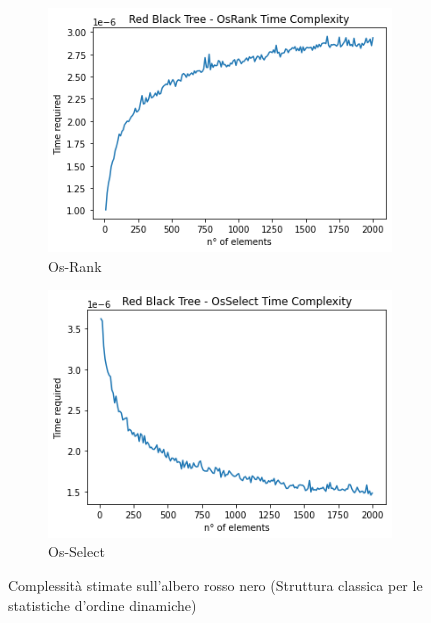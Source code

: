     \begin{figure}[H]
        \centering
        \begin{subfigure}[H]{0.4\textwidth}
            \centering
            \includegraphics[width=1\textwidth]{Images/RB-RANK.png}
            \caption{Os-Rank}
        \end{subfigure}
        \begin{subfigure}[H]{0.4\textwidth}
            \centering
            \includegraphics[width=1\textwidth]{Images/RB-SELECT.png}
            \caption{Os-Select}
        \end{subfigure}
    \caption{Complessità stimate sull'albero rosso nero (Struttura classica per le statistiche d'ordine dinamiche)}
    \end{figure}


